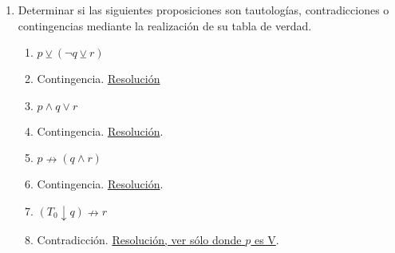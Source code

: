 \documentclass[a4paper]{article}
\newcommand{\answer}{\item[**]}
\newcommand{\exercise}{\item}
\newcommand{\then}{\to}
\newcommand{\eq}{\leftrightarrow}
\newcommand{\xor}{\veebar}
\newcommand{\nor}{\downarrow}
\newcommand{\nimply}{\nrightarrow}
\begin{document}
\begin{enumerate}[resume]
\begin{multicols}{2}
\begin{enumerate} [label=(\alph*)]
		\item Vine en tren y suspendieron el servicio, así que tengo que volver en colectivo o caminando.
		\answer $( p  \land  q ) \land ( p  \land  q  \then  r \lor  s )$ con $p$:"\textit{Vine en tren}", $q$:"\textit{Suspendieron el servicio}", $r$:"\textit{Tengo que volver en colectivo}" y $s$:"\textit{Tengo que volver caminando}". Notar que además de enunciar la relacion de implicación entre las proposiciones se debe afirmar que se cumple el antecedente.

		\item En un juego son importantes las mecánicas y la historia. Las mecánicas mantienen a la persona jugadora activa. La historia la mantiene interesada. 
		\answer $( p  \land  q )  \land  r  \land  s $. $p$:"\textit{En un juego son importantes las mecánicas}", $q$:"\textit{En un juego es importantes la historia}", $r$:"\textit{Las mecánicas mantienen a la persona jugadora activa}" y $s$:"\textit{La historia la mantiene interesada}".

		\item Decir que los fantasmas se ponen azules cuando el pacman come la fruta, es lo mismo que decir que los fantasmas están azules o el pacman no se comió la fruta. 
		\answer $( q \then  p ) \eq  ( p \lor  \neg q)$ con $p$:"\textit{Los fantasmas se ponen azules}" y $q$:"\textit{El pacman come la fruta}".

	\end{enumerate}
	\end{multicols}

	\exercise Determinar si las siguientes proposiciones son tautologías, contradicciones o contingencias mediante la realización de su tabla de verdad. 
	\begin{multicols}{2}
	\begin{enumerate} [label=(\alph*)]
		\item $p \xor  (\neg q \xor  r)$
		\answer Contingencia. \href{https://www.wolframalpha.com/input?i=p+or++%28not+q+xor++r%29}{Resolución}

		\item $p \land  q \lor  r$
		\answer Contingencia. \href{https://www.wolframalpha.com/input?i=p+and++q+or++r}{Resolución}.

		\item $p \nimply (q \land  r)$
		\answer Contingencia. \href{https://www.wolframalpha.com/input?i=not+%28p+%3D%3E+%28q+and++r%29%29}{Resolución}.

		\item $(T_0 \nor q) \nimply r$
		\answer Contradicción. \href{https://www.wolframalpha.com/input?i=not+%28%28p+nor+q%29+%3D%3E+r%29}{Resolución, ver sólo donde $p$ es V}.


\end{enumerate}
\end{multicols}
\end{enumerate}
\end{document}
